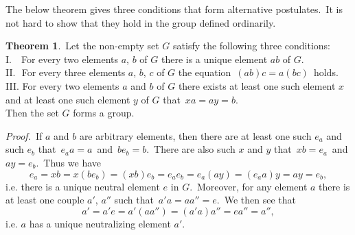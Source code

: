 \documentclass[12pt]{article}
\theoremstyle{definition}
\newtheorem*{thmplain}{Theorem}
\begin{document}
The below theorem gives three conditions that form alternative  postulates. \,It is not hard to show that they hold in the group defined ordinarily.

\begin{thmplain}
 \,Let the non-empty set $G$ satisfy the following three conditions:\\
I. \,\,\,\,For every two elements $a$, $b$ of $G$ there is a unique element $ab$ of $G$.\\
II. \,\,For every three elements $a$, $b$, $c$ of $G$ the equation\, $(ab)c = a(bc)$\, holds.\\
III. For every two elements $a$ and $b$ of $G$ there exists at least one such element $x$ and at least one such element $y$ of $G$ that\, $xa = ay = b$.\\
Then the set $G$ forms a group.
\end{thmplain}

{\em Proof.} \,If $a$ and $b$ are arbitrary elements, then there are at least one such $e_a$ and such $e_b$ that\, $e_aa = a$\, and\, $be_b = b$.\, There are also such $x$ and $y$ that\, $xb = e_a$\, and\, $ay = e_b$.\, Thus we have
   $$e_a = xb = x(be_b) = (xb)e_b = e_ae_b = e_a(ay) = (e_aa)y = ay = e_b,$$
i.e. there is a unique neutral element $e$ in $G$.\, Moreover, for any element $a$ there is at least one couple $a'$, $a''$ such that\,  $a'a = aa'' = e$.\, We then see that
  $$a' = a'e = a'(aa'') = (a'a)a'' = ea'' = a'',$$
i.e. $a$ has a unique neutralizing element $a'$.
\end{document}
